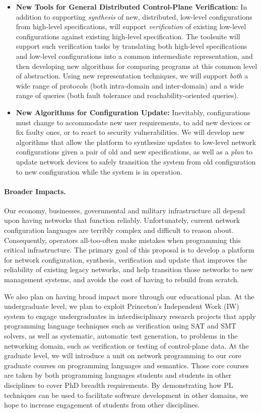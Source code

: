 \begin{itemize}
\item {\bf New Tools for General Distributed Control-Plane Verification:}  In addition to supporting
\emph{synthesis} of new, distributed, low-level configurations from high-level specifications, \Propane will support \emph{verification} of existing 
low-level configurations against existing high-level specification.  The \Propane toolsuite will support such verification tasks by translating
both high-level specifications and low-level configurations into a common intermediate representation, and then developing new algorithms for
comparing programs at this common level of abstraction.  Using new representation techniques, we will support \emph{both} a wide
range of protocols (both intra-domain and inter-domain) and a wide range of queries (both fault tolerance and reachability-oriented queries).

\item {\bf New Algorithms for Configuration Update:}  Inevitably, configurations must change to accommodate new user requirements, to add new devices
or fix faulty ones, or to react to security vulnerabilities.  We will develop new algorithms that allow the \Propane platform to synthesize
updates to low-level network configurations given a pair of old and new \Propane specifications, as well as a \emph{plan} to update network devices to
safely transition the system from old configuration to new configuration while the system is in operation.
\end{itemize}

\paragraph{Broader Impacts.}  
Our economy, businesses, governmental and military infrastructure all depend upon having networks that function
reliably.  Unfortunately, current network configuration languages are
terribly complex and difficult to reason about.  Consequently,
operators all-too-often make mistakes when programming this critical
infrastructure.  The primary goal of this proposal is to develop
a platform for network configuration, synthesis, verification and update that
improves the reliability of existing legacy networks, and help
transition those networks to new management systems, and avoids
the cost of having to rebuild from scratch.

We also plan on having broad impact more through our educational
plan. At the undergraduate level, we plan to exploit Princeton's
Independent Work (IW) system to engage undergraduates in interdisciplinary
research projects that apply programming language techniques such as
verification using SAT and SMT solvers, as well as systematic,
automatic test generation, to problems in the networking domain, such
as verification or testing of control-plane data.  At the graduate
level, we will introduce a unit on network programming to our core
graduate courses on programming languages and semantics.  Those core
courses are taken by both programming languages students and students
in other disciplines to cover PhD breadth requirements.  By
demonstrating how PL techniques can be used to facilitate software
development in other domains, we hope to increase engagement of
students from other disciplines.

